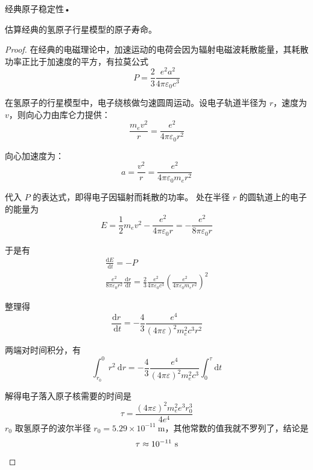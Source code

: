 \begin{7}
   经典原子稳定性•
    
估算经典的氢原子行星模型的原子寿命。
\end{7}
\begin{proof}
在经典的电磁理论中，加速运动的电荷会因为辐射电磁波耗散能量，其耗散功率正比于加速度的平方，有拉莫公式
$$P=\frac{2}{3} \frac{e^{2} a^{2}}{4 \pi \varepsilon_{0} c^{3}}$$

在氢原子的行星模型中，电子绕核做匀速圆周运动。设电子轨道半径为 $r$，速度为 $v$，则向心力由库仑力提供：
$$\frac{m_{e} v^{2}}{r}=\frac{e^{2}}{4 \pi \varepsilon_{0} r^{2}}$$

向心加速度为：
$$a=\frac{v^{2}}{r}=\frac{e^{2}}{4 \pi \varepsilon_{0} m_{e} r^{2}}$$

代入 $P$ 的表达式，即得电子因辐射而耗散的功率。
处在半径 $r$ 的圆轨道上的电子的能量为
$$E=\frac{1}{2} m_{e} v^{2}-\frac{e^{2}}{4 \pi \varepsilon_{0} r}
=-\frac{e^{2}}{8 \pi \varepsilon_{0} r}$$

于是有
$$
\begin{gathered}
\frac{\mathrm{d} E}{\mathrm{~d} t}=-P \\
\frac{e^{2}}{8 \pi \varepsilon_{0} r^{2}} \frac{\mathrm{~d} r}{\mathrm{~d} t}=\frac{2}{3} \frac{e^{2}}{4 \pi \varepsilon_{0} c^{3}}\left(\frac{e^{2}}{4 \pi \varepsilon_{0} m_{e} r^{2}}\right)^{2}
\end{gathered}
$$

整理得
$$\frac{\mathrm{d} r}{\mathrm{~d} t}
=-\frac{4}{3} \frac{e^{4}}{(4 \pi \varepsilon)^{2} m_{e}^{2} c^{3} r^{2}}$$

两端对时间积分，有
$$\int_{r_{0}}^{0} r^{2} \mathrm{~d} r
=-\frac{4}{3} \frac{e^{4}}{(4 \pi \varepsilon)^{2} m_{e}^{2} c^{3}} \int_{0}^{\tau} \mathrm{d} t$$

解得电子落入原子核需要的时间是
$$\tau=\frac{(4 \pi \varepsilon)^{2} m_{e}^{2} e^{3} r_{0}^{3}}{4 e^{4}}$$
$r_{0}$ 取氢原子的波尔半径 $r_{0}=5.29 \times 10^{-11} \mathrm{~m}$，其他常数的值我就不罗列了，结论是
$$\tau \approx 10^{-11} \mathrm{~s}\qedhere$$
\end{proof}




